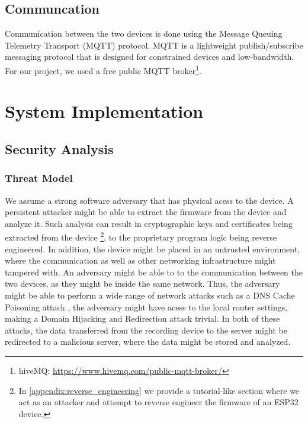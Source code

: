 \documentclass[conference]{IEEEtran}
\begin{document}
\subsection{Communcation}

Communication between the two devices is done using the Message Queuing Telemetry Transport (MQTT) protocol\cite{MQTT_Survey}.
MQTT is a lightweight publish/subscribe messaging protocol that is designed for constrained devices and low-bandwidth.
For our project, we used a free public MQTT broker\footnote{hiveMQ: \url{https://www.hivemq.com/public-mqtt-broker/}}.

\section{System Implementation}
\label{sec:system_implementation}

\subsection{Security Analysis}
\label{subsec:security_analysis}


\subsubsection{Threat Model}

We assume a strong software adversary that has physical acess to the device.
A persistent attacker might be able to extract the firmware from the device and
analyze it. Such analysis can result in cryptographic keys and certificates being extracted from the device
\footnote{In \cref{appendix:reverse_engineering} we provide a tutorial-like section where we act as an attacker and attempt to reverse engineer the firmware of an ESP32 device.}, 
to the proprietary program logic being reverse engineered.
In addition, the device might be placed in an untrusted environment, where the communication as well 
as other networking infrastructure might tampered with.
An adversary might be able to  to the communication between the two devices,
as they might be inside the same network.
Thus, the adversary might be able to perform a wide range of network attacks such 
as a DNS Cache Poisoning attack \cite{Dissanayake_2018}, the adversary might have acess to the local router 
settings, making a Domain Hijacking and Redirection attack \cite{DnsHijacking} trivial. In both of these attacks, 
the data transferred from the recording device to the server might be redirected to a malicious server, 
where the data might be stored and analyzed.
\end{document}
